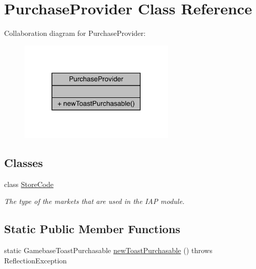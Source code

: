 \hypertarget{classcom_1_1toast_1_1android_1_1gamebase_1_1base_1_1purchase_1_1_purchase_provider}{}\section{Purchase\+Provider Class Reference}
\label{classcom_1_1toast_1_1android_1_1gamebase_1_1base_1_1purchase_1_1_purchase_provider}


Collaboration diagram for Purchase\+Provider\+:
\nopagebreak
\begin{figure}[H]
\begin{center}
\leavevmode
\includegraphics[width=209pt]{classcom_1_1toast_1_1android_1_1gamebase_1_1base_1_1purchase_1_1_purchase_provider__coll__graph}
\end{center}
\end{figure}
\subsection*{Classes}
\begin{DoxyCompactItemize}
\item 
class \hyperlink{classcom_1_1toast_1_1android_1_1gamebase_1_1base_1_1purchase_1_1_purchase_provider_1_1_store_code}{Store\+Code}
\begin{DoxyCompactList}\small\item\em The type of the markets that are used in the I\+AP module. \end{DoxyCompactList}\end{DoxyCompactItemize}
\subsection*{Static Public Member Functions}
\begin{DoxyCompactItemize}
\item 
static Gamebase\+Toast\+Purchasable \hyperlink{classcom_1_1toast_1_1android_1_1gamebase_1_1base_1_1purchase_1_1_purchase_provider_aae5ed920daee94ccdedd85eea32e3ee9}{new\+Toast\+Purchasable} ()  throws Reflection\+Exception 
\end{DoxyCompactItemize}



